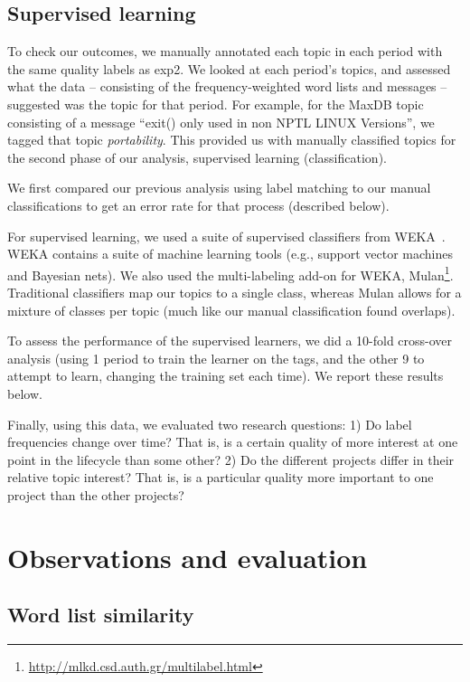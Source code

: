 \documentclass[10pt, conference, compsocconf]{IEEEtran}
\begin{document}
\subsection{Supervised learning}
To check our outcomes, we manually annotated each topic in each period with the same quality labels as \textsf{exp2}. We looked at each period's topics, and assessed what the data -- consisting of the frequency-weighted word lists and messages -- suggested was the topic for that period. For example, for the MaxDB topic consisting of a message ``exit() only used in non NPTL LINUX Versions'', we tagged that topic \emph{portability}. This provided us with manually classified topics for the second phase of our analysis, supervised learning (classification).

We first compared our previous analysis using label matching to our manual classifications to get an error rate for that process (described below). 

For supervised learning, we used a suite of supervised classifiers from WEKA~\cite{weka09}. WEKA contains a suite of machine learning tools (e.g., support vector machines and Bayesian nets). We also used the multi-labeling add-on for WEKA, Mulan\footnote{\url{http://mlkd.csd.auth.gr/multilabel.html}}. Traditional classifiers map our topics to a single class, whereas Mulan allows for a mixture of classes per topic (much like our manual classification found overlaps). 

To assess the performance of the supervised learners, we did a 10-fold cross-over analysis (using 1 period to train the learner on the tags, and the other 9 to attempt to learn, changing the training set each time). We report these results below.

Finally, using this data, we evaluated two research questions: 1) Do label frequencies change over time? That is, is a certain quality of more interest at one point in the lifecycle than some other? 2) Do the different projects differ in their relative topic interest? That is, is a particular quality more important to one project than the other projects?  

\section{Observations and evaluation}

\subsection{Word list similarity}
\end{document}
